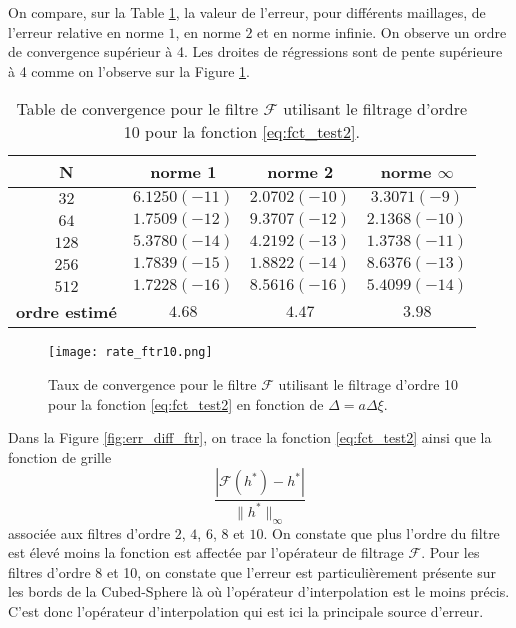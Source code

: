 On compare, sur la Table \ref{tab:rate_ftr10}, la valeur de l'erreur, pour différents maillages, de l'erreur relative en norme $1$, en norme $2$ et en norme infinie. On observe un ordre de convergence supérieur à 4. Les droites de régressions sont de pente supérieure à 4 comme on l'observe sur la Figure \ref{fig:rate_ftr10}.

\begin{table}[htbp]
\begin{center}
\begin{tabular}{|c||c|c|c|}
\hline
\textbf{N}  & \textbf{norme 1} & \textbf{norme 2} & \textbf{norme $\infty$} \\
\hline
\hline
$32$ & $6.1250(-11)$  & $2.0702(-10)$  & $3.3071(-9)$  \\
$64$ & $1.7509(-12)$  & $9.3707(-12)$  & $2.1368(-10)$  \\
$128$& $5.3780(-14)$  & $4.2192(-13)$  & $1.3738(-11)$  \\
$256$& $1.7839(-15)$  & $1.8822(-14)$  & $8.6376(-13)$  \\
$512$& $1.7228(-16)$  & $8.5616(-16)$  & $5.4099(-14)$  \\
\hline
\hline
\textbf{ordre estimé}& $4.68$ & $4.47$ & $3.98$\\
\hline
\end{tabular}
\end{center}
\caption{Table de convergence pour le filtre $\mathcal{F}$ utilisant le filtrage d'ordre 10 pour la fonction \eqref{eq:fct_test2}.}
\label{tab:rate_ftr10}
\end{table} 

\begin{figure}[htbp]
\begin{center}
\texttt{[image: rate\_ftr10.png]}
\end{center}
\caption{Taux de convergence pour le filtre $\mathcal{F}$ utilisant le filtrage d'ordre 10 pour la fonction \eqref{eq:fct_test2} en fonction de $\Delta = a \Delta \xi$.}
\label{fig:rate_ftr10}
\end{figure}

Dans la Figure \ref{fig:err_diff_ftr}, on trace la fonction \eqref{eq:fct_test2} ainsi que la fonction de grille
\begin{equation}
\dfrac{|\mathcal{F}(h^*) - h^*|}{\| h^* \|_{\infty}}
\label{eq:ftr_err}
\end{equation}
associée aux filtres d'ordre $2$, $4$, $6$, $8$ et $10$. On constate que plus l'ordre du filtre est élevé moins la fonction est affectée par l'opérateur de filtrage $\mathcal{F}$. Pour les filtres d'ordre 8 et 10, on constate que l'erreur est particulièrement présente sur les bords de la Cubed-Sphere là où l'opérateur d'interpolation est le moins précis. C'est donc l'opérateur d'interpolation qui est ici la principale source d'erreur.

